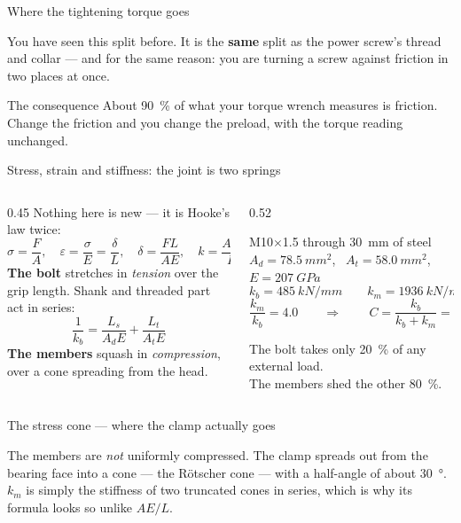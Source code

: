 \documentclass[aspectratio=169,10pt]{beamer}
\begin{document}
\begin{frame}{Where the tightening torque goes}
\centering
\resizebox{0.92\textwidth}{!}{}
\vfill
\raggedright
You have seen this split before. It is the \textbf{same} split as the power screw's thread and collar
--- and for the same reason: you are turning a screw against friction in two places at once.
\vfill
\begin{alertblock}{The consequence}
About \SI{90}{\percent} of what your torque wrench measures is friction. \alert{Change the friction
and you change the preload, with the torque reading unchanged.}
\end{alertblock}
\end{frame}

\begin{frame}{Stress, strain and stiffness: the joint is two springs}
\begin{columns}[T]
\begin{column}{0.45\textwidth}
Nothing here is new --- it is Hooke's law twice:
\[ \sigma=\frac{F}{A},\quad \varepsilon=\frac{\sigma}{E}=\frac{\delta}{L},
   \quad \delta=\frac{FL}{AE},\quad k=\frac{AE}{L} \]
\vspace{-4pt}
\textbf{The bolt} stretches in \emph{tension} over the grip length. Shank and threaded part act in
series:
\[ \frac{1}{k_b}=\frac{L_s}{A_d E}+\frac{L_t}{A_t E} \]
\textbf{The members} squash in \emph{compression}, over a cone spreading from the head.
\end{column}
\begin{column}{0.52\textwidth}
\begin{block}{M10$\times$1.5 through \SI{30}{mm} of steel}
\small
$A_d = \SI{78.5}{mm^2}$, \ $A_t = \SI{58.0}{mm^2}$, \ $E = \SI{207}{GPa}$
\[ k_b = \SI{485}{kN/mm} \qquad k_m = \SI{1936}{kN/mm} \]
\[ \frac{k_m}{k_b} = 4.0
   \qquad\Rightarrow\qquad
   \boxed{\,C=\frac{k_b}{k_b+k_m}=0.20\,} \]
\end{block}
\centering
\alert{The bolt takes only \SI{20}{\percent} of any external load.}\\
The members shed the other \SI{80}{\percent}.
\end{column}
\end{columns}
\end{frame}

\begin{frame}{The stress cone --- where the clamp actually goes}
\centering
\resizebox{!}{3.4cm}{}
\vfill
\raggedright
The members are \emph{not} uniformly compressed. The clamp spreads out from the bearing face into a
cone --- the R\"otscher cone --- with a half-angle of about \SI{30}{\degree}. \alert{$k_m$ is simply
the stiffness of two truncated cones in series}, which is why its formula looks so unlike $AE/L$.
\end{frame}
\end{document}
